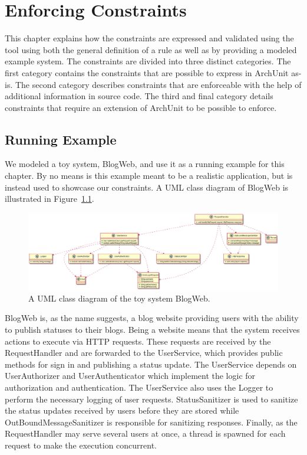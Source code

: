\chapter{Enforcing Constraints}
\label{ch:enforcing_constraints}

This chapter explains how the constraints are expressed and validated using the tool using both the general definition of a rule as well as by providing a modeled example system. The constraints are divided into three distinct categories. The first category contains the constraints that are possible to express in ArchUnit as-is. The second category describes constraints that are enforceable with the help of additional information in source code. The third and final category details constraints that require an extension of ArchUnit to be possible to enforce.

\section{Running Example}
We modeled a toy system, BlogWeb, and use it as a running example for this chapter. By no means is this example meant to be a realistic application, but is instead used to showcase our constraints.
A UML class diagram of BlogWeb is illustrated in Figure~\ref{fig:toy_application}.


\begin{figure}
    \centering
    \includegraphics[width=\textwidth]{figure/ToyApp.png}
    \caption{A UML class diagram of the toy system BlogWeb.}
    \label{fig:toy_application}
\end{figure}

BlogWeb is, as the name suggests, a blog website providing users with the ability to publish statuses to their blogs. Being a website means that the system receives actions to execute via HTTP requests. These requests are received by the RequestHandler and are forwarded to the UserService, which provides public methods for sign in and publishing a status update. The UserService depends on UserAuthorizer and UserAuthenticator which implement the logic for authorization and authentication. The UserService also uses the Logger to perform the necessary logging of user requests. StatusSanitizer is used to sanitize the status updates received by users before they are stored while OutBoundMessageSanitizer is responsible for sanitizing responses. Finally, as the RequestHandler may serve several users at once, a thread is spawned for each request to make the execution concurrent. 



